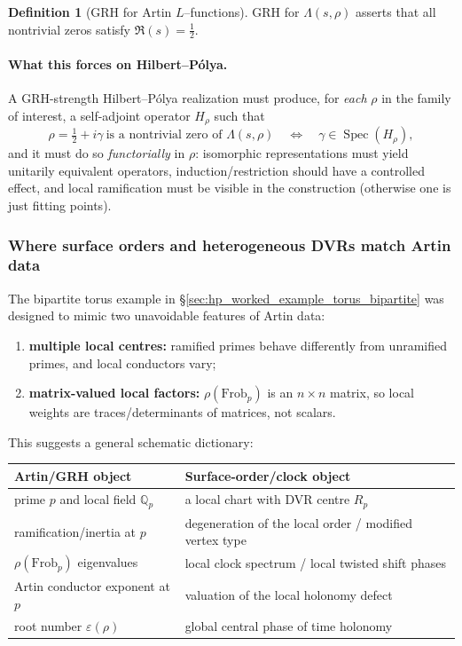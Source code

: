 \documentclass[11pt,oneside]{amsbook}
\numberwithin{equation}{section}
\theoremstyle{plain}
\theoremstyle{definition}
\newtheorem{definition}[theorem]{Definition}
\theoremstyle{remark}
\newcommand{\Q}{\mathbb{Q}}
\DeclareMathOperator{\Spec}{\mathrm{Spec}}
\begin{document}
\begin{definition}[GRH for Artin $L$--functions]
GRH for $\Lambda(s,\rho)$ asserts that all nontrivial zeros satisfy $\Re(s)=\tfrac12$.
\end{definition}

\paragraph{What this forces on Hilbert--Pólya.}
A GRH-strength Hilbert--Pólya realization must produce, for \emph{each} $\rho$ in the family of interest, a self-adjoint operator $H_\rho$ such that
\[
\rho=\tfrac12+i\gamma\ \text{is a nontrivial zero of }\Lambda(s,\rho)\quad \Longleftrightarrow\quad \gamma\in \Spec(H_\rho),
\]
and it must do so \emph{functorially} in $\rho$:
isomorphic representations must yield unitarily equivalent operators, induction/restriction should have a controlled effect, and local ramification must be visible in the construction (otherwise one is just fitting points).

\subsubsection{Where surface orders and heterogeneous DVRs match Artin data}

The bipartite torus example in \S\ref{sec:hp_worked_example_torus_bipartite} was designed to mimic two unavoidable features of Artin data:
\begin{enumerate}[label=(\alph*)]
\item \textbf{multiple local centres:} ramified primes behave differently from unramified primes, and local conductors vary;
\item \textbf{matrix-valued local factors:} $\rho(\mathrm{Frob}_p)$ is an $n\times n$ matrix, so local weights are traces/determinants of matrices, not scalars.
\end{enumerate}

This suggests a general schematic dictionary:

\begin{center}
\begin{tabular}{@{}ll@{}}
\toprule
Artin/GRH object & Surface-order/clock object \\
\midrule
prime $p$ and local field $\Q_p$ & a local chart with DVR centre $R_p$ \\
ramification/inertia at $p$ & degeneration of the local order / modified vertex type \\
$\rho(\mathrm{Frob}_p)$ eigenvalues & local clock spectrum / local twisted shift phases \\
Artin conductor exponent at $p$ & valuation of the local holonomy defect \\
root number $\varepsilon(\rho)$ & global central phase of time holonomy \\
\bottomrule
\end{tabular}
\end{center}
\end{document}
